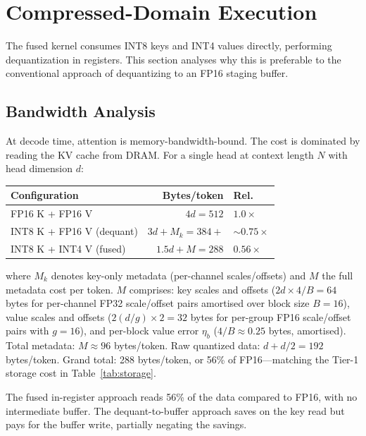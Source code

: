 \documentclass[10pt,twocolumn,a4paper]{article}
\theoremstyle{definition}
\theoremstyle{remark}
\begin{document}
\section{Compressed-Domain Execution}
\label{sec:compressed}

The fused kernel consumes INT8 keys and INT4 values directly, performing dequantization in registers.  This section analyses why this is preferable to the conventional approach of dequantizing to an FP16 staging buffer.

\subsection{Bandwidth Analysis}

At decode time, attention is memory-bandwidth-bound.  The cost is dominated by reading the KV cache from DRAM\@.  For a single head at context length $N$ with head dimension $d$:

\begin{center}
\footnotesize
\begin{tabular}{lrl}
\toprule
\textbf{Configuration} & \textbf{Bytes/token} & \textbf{Rel.} \\
\midrule
FP16 K + FP16 V & $4d = 512$ & $1.0\times$ \\
INT8 K + FP16 V (dequant) & $3d{+}M_k = 384{+}$ & ${\sim}0.75\times$ \\
INT8 K + INT4 V (fused) & $1.5d{+}M = 288$ & $0.56\times$ \\
\bottomrule
\end{tabular}
\end{center}

\noindent where $M_k$ denotes key-only metadata (per-channel scales/offsets) and $M$ the full metadata cost per token.  $M$ comprises: key scales and offsets ($2d \times 4/B = 64$ bytes for per-channel FP32 scale/offset pairs amortised over block size $B{=}16$), value scales and offsets ($2(d/g) \times 2 = 32$ bytes for per-group FP16 scale/offset pairs with $g{=}16$), and per-block value error $\eta_b$ ($4/B \approx 0.25$ bytes, amortised).  Total metadata: $M \approx 96$ bytes/token.  Raw quantized data: $d + d/2 = 192$ bytes/token.  Grand total: 288 bytes/token, or 56\% of FP16---matching the Tier-1 storage cost in Table~\ref{tab:storage}.

The fused in-register approach reads 56\% of the data compared to FP16, with no intermediate buffer.  The dequant-to-buffer approach saves on the key read but pays for the buffer write, partially negating the savings.
\end{document}

